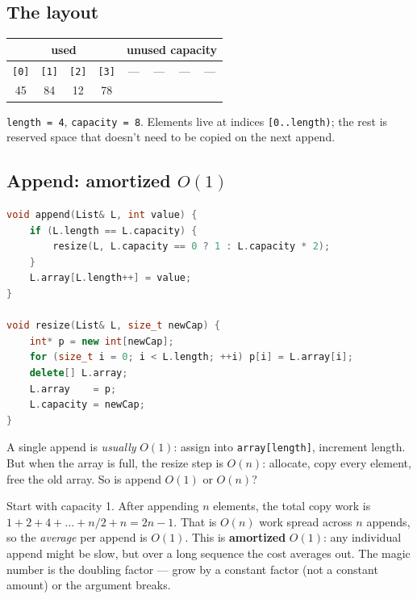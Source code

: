 \documentclass[11pt]{article}
\begin{document}
\subsection*{The layout}

\begin{center}
\begin{tabular}{|c|c|c|c|c|c|c|c|}
\hline
\multicolumn{4}{|c|}{\textbf{used}} & \multicolumn{4}{c|}{\textbf{unused capacity}} \\
\hline
\texttt{[0]} & \texttt{[1]} & \texttt{[2]} & \texttt{[3]} & --- & --- & --- & --- \\
\hline
45 & 84 & 12 & 78 & & & & \\
\hline
\end{tabular}
\end{center}

\noindent \texttt{length = 4}, \texttt{capacity = 8}. Elements
live at indices \texttt{[0..length)}; the rest is reserved space
that doesn't need to be copied on the next append.

\subsection*{Append: amortized $O(1)$}

\begin{examplebox}
\begin{lstlisting}[language=C++,basicstyle=\ttfamily\small,frame=single]
void append(List& L, int value) {
    if (L.length == L.capacity) {
        resize(L, L.capacity == 0 ? 1 : L.capacity * 2);
    }
    L.array[L.length++] = value;
}

void resize(List& L, size_t newCap) {
    int* p = new int[newCap];
    for (size_t i = 0; i < L.length; ++i) p[i] = L.array[i];
    delete[] L.array;
    L.array    = p;
    L.capacity = newCap;
}
\end{lstlisting}
\end{examplebox}

A single append is \emph{usually} $O(1)$: assign into
\texttt{array[length]}, increment length. But when the array is
full, the resize step is $O(n)$: allocate, copy every element,
free the old array. So is append $O(1)$ or $O(n)$?

\begin{ideabox}
Start with capacity 1. After appending $n$ elements, the total
copy work is $1 + 2 + 4 + \ldots + n/2 + n = 2n - 1$. That is
$O(n)$ work spread across $n$ appends, so the \emph{average} per
append is $O(1)$. This is \textbf{amortized} $O(1)$: any
individual append might be slow, but over a long sequence the
cost averages out. The magic number is the doubling factor ---
grow by a constant factor (not a constant amount) or the
argument breaks.
\end{ideabox}
\end{document}
